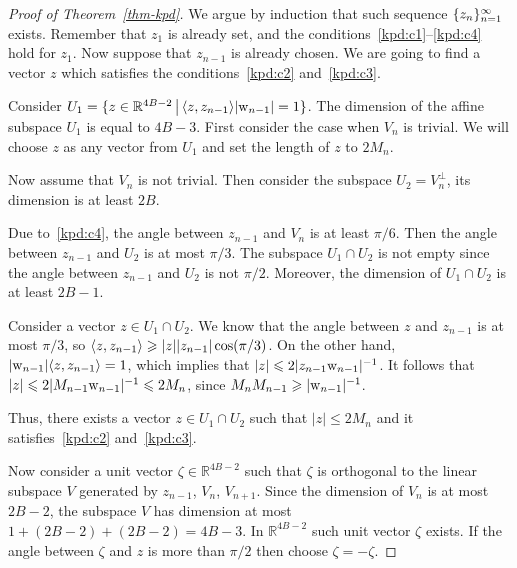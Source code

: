\documentclass[12pt,oneside,a4paper]{amsart}
\begin{document}
\begin{proof}[Proof of Theorem~\ref{thm-kpd}]
        We argue by induction that such sequence $\{{z}_n\}_{n=1}^\infty$ exists.
        Remember that $z_1$ is already set, and the conditions~\ref{kpd:c1}--\ref{kpd:c4} hold for $z_1$.
        Now suppose that $z_{n - 1}$ is already chosen.
        We are going to find a vector $z$ which satisfies the conditions~\ref{kpd:c2} and~\ref{kpd:c3}.

        Consider $U_1 = \{z \in \mathbb{R}^{4B-2}\, \big| \, \langle z, z_{n-1} \rangle\lvert\mathrm{w}_{n-1}\rvert  = 1\}$.
        The dimension of the affine subspace $U_1$ is equal to $4B - 3$.
        First consider the case when $V_n$ is trivial. We will choose $z$ as any vector from $U_1$
          and set the length of $z$ to $2 M_n$.

        Now assume that $V_n$ is not trivial.
        Then consider the subspace $U_2 = V_n^\bot$, its dimension is at least $2B$.

        Due to~\ref{kpd:c4}, the angle between $z_{n - 1}$ and $V_n$ is at least $\pi / 6$.
        Then the angle between $z_{n - 1}$ and $U_2$ is at most $\pi / 3$.
        The subspace $U_1 \cap U_2$ is not empty since the angle between $z_{n-1}$ and $U_2$ is not $\pi / 2$.
        Moreover, the dimension of $U_1 \cap U_2$ is at least $2B - 1$.

        Consider a vector $z \in U_1 \cap U_2$.
        We know that the angle between $z$ and $z_{n-1}$ is at most $\pi / 3$,
          so $\langle z, z_{n-1} \rangle \geqslant \lvert z \rvert \lvert z_{n-1}\rvert  \cos(\pi / 3)$.
        On the other hand, $\lvert\mathrm{w}_{n-1}\rvert \langle z, z_{n-1} \rangle = 1$, which implies
          that $\lvert z\rvert \leqslant 2 \lvert z_{n-1} \mathrm{w}_{n-1}\rvert^{-1}$.
        It follows that $\lvert z\rvert \leqslant 2 \lvert  M_{n-1} \mathrm{w}_{n-1}\rvert^{-1}
          \leqslant 2 M_n$, since $M_n M_{n-1} \geqslant \lvert \mathrm{w}_{n-1} \rvert^{-1}$.

        Thus, there exists a vector $z \in U_1 \cap U_2$ such that $\lvert z\rvert \leq 2 M_n$ and
          it satisfies~\ref{kpd:c2} and~\ref{kpd:c3}.

        Now consider a unit vector $\zeta \in \mathbb{R}^{4B - 2}$
          such that $\zeta$ is orthogonal to the linear subspace $V$ generated by
          $z_{n-1}$, $V_{n}$, $V_{n + 1}$.
        Since the dimension of $V_n$ is at most $2B - 2$,
          the subspace $V$ has dimension at most $1 + (2B - 2) + (2B - 2) = 4B - 3$.
        In $\mathbb{R}^{4B - 2}$ such unit vector $\zeta$ exists.
        If the angle between $\zeta$ and $z$ is more than $\pi/2$ then choose $\zeta = -\zeta$.


\end{proof}
\end{document}
